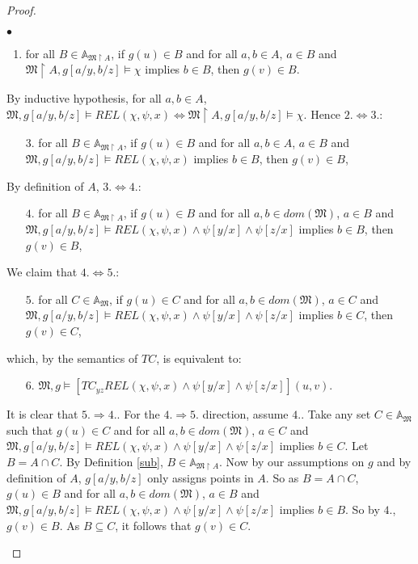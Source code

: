 \documentclass{LMCS}
\newcommand{\frM}{\mathfrak{M}}
\begin{document}
\begin{proof}
\begin{iteMize}{$\bullet$}
\begin{enumerate}[$1.$]
\item for all $B \in \mathbb{A}_{\frM \upharpoonright A}$, if $g(u) \in B$ and for all $a, b \in A$, $a\in B$ and $\frM \upharpoonright A, g[a/y,b/z] \models \chi$ implies $b\in B$, then $g(v)\in B$.
\end{enumerate}
By inductive hypothesis, for all $a, b \in A$,\\
 $\frM, g[a/y,b/z] \models REL(\chi,\psi,x) \Leftrightarrow \frM \upharpoonright A, g[a/y,b/z] \models \chi$. Hence $2. \Leftrightarrow 3.$:
\begin{enumerate}
\item [$3.$] for all $B \in \mathbb{A}_{\frM \upharpoonright A}$, if $g(u) \in B$ and for all $a,b\in A$, $a\in B$ and $\frM, g[a/y,b/z] \models REL(\chi,\psi,x)$ implies $b\in B$, then $g(v)\in B$,
\end{enumerate}
By definition of $A$, $3. \Leftrightarrow 4.$:
\begin{enumerate}
\item [$4.$] for all $B \in \mathbb{A}_{\frM \upharpoonright A}$, if $g(u) \in B$ and for all $a,b\in dom(\frM)$, $a\in B$ and $\frM, g[a/y,b/z] \models REL(\chi,\psi,x) \wedge \psi[y/x] \wedge \psi[z/x]$ implies $b\in B$, then $g(v)\in B$,
\end{enumerate}
We claim that $4. \Leftrightarrow 5.$:
\begin{enumerate}
\item [$5.$]for all $C \in \mathbb{A}_{\frM}$, if $g(u) \in C$ and for all $a, b \in dom(\frM)$, $a\in C$ and $\frM, g[a/y,b/z] \models REL(\chi,\psi,x) \wedge \psi[y/x] \wedge \psi[z/x]$ implies $b\in C$, then $g(v)\in C$,
\end{enumerate}
which, by the semantics of $TC$, is equivalent to:
\begin{enumerate}
\item   [$6.$]$\frM, g \models [TC_{yz} REL(\chi,\psi,x) \wedge \psi[y/x] \wedge \psi[z/x]](u,v)$.
\end{enumerate}
It is clear that $5. \Rightarrow 4.$. For the $4. \Rightarrow 5.$ direction, assume $4.$. Take any set $C\in \mathbb{A}_\frM$ such that $g(u) \in C$ and for all $a,b\in dom(\frM)$, $a\in C$ and $\frM, g[a/y,b/z] \models REL(\chi,\psi,x) \wedge \psi[y/x] \wedge \psi[z/x]$ implies $b\in C$. Let $B=A \cap C$. By Definition \ref{sub}, $B \in \mathbb{A}_{\frM \upharpoonright A}$. Now by our assumptions on $g$ and by definition of $A$, $g[a/y,b/z]$ only assigns points in $A$. So as $B = A \cap C$, $g(u) \in B$ and for all $a,b\in dom(\frM)$, $a\in B$ and $\frM, g[a/y,b/z] \models REL(\chi,\psi,x) \wedge \psi[y/x] \wedge \psi[z/x]$ implies $b\in B$. So by $4.$, $g(v) \in B$. As $B \subseteq C$, it follows that $g(v)\in C$.

\end{iteMize}
\end{proof}
\end{document}
